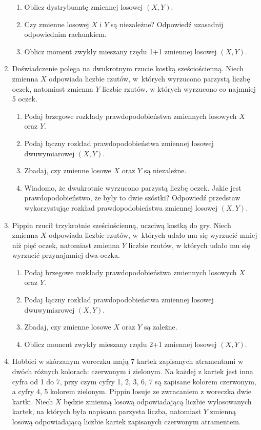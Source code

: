 \documentclass{mwart}
\newcommand{\ans}[1]{}
\newcommand{\ans}[1]{\emph{Odpowiedź:} #1}
\begin{document}
\begin{enumerate}
\begin{enumerate}
\item Oblicz dystrybuantę zmiennej losowej $(X,Y)$.
\item Czy zmienne losowej $X$ i $Y$ są niezależne? Odpowiedź uzasadnij odpowiednim rachunkiem. \ans{Nie, $0=P(1,0)\neq P(X=1)P(Y=0)=\frac{39}{52^2}$}
\item Oblicz moment zwykły mieszany rzędu 1+1 zmiennej losowej $(X,Y)$. \ans{$EXY=\frac{1}{52}$}
\end{enumerate}
\item Doświadczenie polega na dwukrotnym rzucie kostką sześciościenną. Niech zmienna $X$ odpowiada liczbie rzutów, w~których wyrzucono parzystą liczbę oczek, natomiast zmienna $Y$ liczbie rzutów, w których wyrzucono co najmniej 5 oczek.
\begin{enumerate}
\item Podaj brzegowe rozkłady prawdopodobieństwa zmiennych losowych $X$ oraz $Y$.
\item Podaj łączny rozkład prawdopodobieństwa zmiennej losowej dwuwymiarowej $(X,Y)$.
\item Zbadaj, czy zmienne losowe $X$ oraz $Y$ są niezależne.
\item Wiadomo, że dwukrotnie wyrzucono parzystą liczbę oczek. Jakie jest prawdopodobieństwo, że były to dwie szóstki? Odpowiedź przedstaw wykorzystując rozkład prawdopodobieństwa zmiennej losowej $(X,Y)$.
\end{enumerate}
\item Pippin rzucił trzykrotnie sześciościenną, uczciwą kostką do gry. Niech zmienna $X$ odpowiada liczbie rzutów, w~których udało mu się wyrzucić mniej niż pięć
oczek, natomiast zmienna $Y$ liczbie rzutów, w których udało mu się wyrzucić przynajmniej dwa oczka.
\begin{enumerate}
\item Podaj brzegowe rozkłady prawdopodobieństwa zmiennych losowych $X$ oraz $Y$.
\item Podaj łączny rozkład prawdopodobieństwa zmiennej losowej dwuwymiarowej $(X,Y)$.
\item Zbadaj, czy zmienne losowe $X$ oraz $Y$ są zależne.
\item Oblicz moment zwykły mieszany rzędu 2+1 zmiennej losowej $(X,Y)$.
\end{enumerate}
\item Hobbici w skórzanym woreczku mają 7 kartek zapisanych atramentami w dwóch różnych kolorach: czerwonym i zielonym.
Na każdej z kartek jest inna cyfra od 1 do 7, przy czym cyfry 1, 2, 3, 6, 7 są zapisane kolorem czerwonym, a cyfry 4, 5 kolorem zielonym.
Pippin losuje ze zwracaniem z woreczka dwie kartki.
Niech $X$ będzie zmienną losową odpowiadającą liczbie wylosowanych kartek, na których była napisana parzysta liczba, natomiast $Y$ zmienną losową odpowiadającą liczbie kartek zapisanych czerwonym atramentem.


\end{enumerate}
\end{document}

